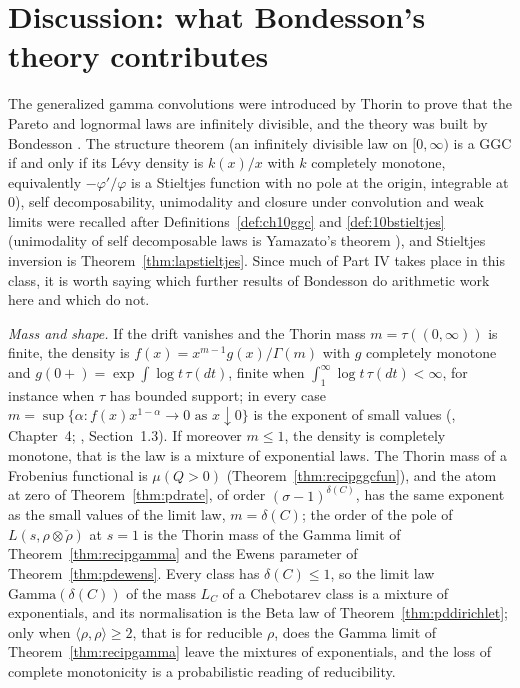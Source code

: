 \section{Discussion: what Bondesson's theory contributes}\label{sec:pdbondesson}

The generalized gamma convolutions were introduced by Thorin \cite{thorin1977,thorin1977b} to prove that the Pareto and lognormal laws are infinitely divisible, and the theory was built by Bondesson \cite{bondesson1992}. The structure theorem (an infinitely divisible law on $[0,\infty)$ is a GGC if and only if its L\'evy density is $k(x)/x$ with $k$ completely monotone, equivalently $-\varphi'/\varphi$ is a Stieltjes function with no pole at the origin, integrable at $0$), self decomposability, unimodality and closure under convolution and weak limits were recalled after Definitions~\ref{def:ch10ggc} and \ref{def:10bstieltjes} (unimodality of self decomposable laws is Yamazato's theorem \cite{yamazato1978}), and Stieltjes inversion is Theorem~\ref{thm:lapstieltjes}. Since much of Part IV takes place in this class, it is worth saying which further results of Bondesson do arithmetic work here and which do not.

\emph{Mass and shape.} If the drift vanishes and the Thorin mass $m=\tau((0,\infty))$ is finite, the density is $f(x)=x^{m-1}g(x)/\Gamma(m)$ with $g$ completely monotone and $g(0+)=\exp\int\log t\,\tau(dt)$, finite when $\int_1^\infty\log t\,\tau(dt)<\infty$, for instance when $\tau$ has bounded support; in every case $m=\sup\{\alpha:f(x)x^{1-\alpha}\to0\text{ as }x\downarrow0\}$ is the exponent of small values (\cite{bondesson1992}, Chapter~4; \cite{jamesroynetteyor2008}, Section~1.3). If moreover $m\le1$, the density is completely monotone, that is the law is a mixture of exponential laws. The Thorin mass of a Frobenius functional is $\mu(Q>0)$ (Theorem~\ref{thm:recipggcfun}), and the atom at zero of Theorem~\ref{thm:pdrate}, of order $(\sigma-1)^{\delta(C)}$, has the same exponent as the small values of the limit law, $m=\delta(C)$; the order of the pole of $L(s,\rho\otimes\check\rho)$ at $s=1$ is the Thorin mass of the Gamma limit of Theorem~\ref{thm:recipgamma} and the Ewens parameter of Theorem~\ref{thm:pdewens}. Every class has $\delta(C)\le1$, so the limit law $\mathrm{Gamma}(\delta(C))$ of the mass $L_C$ of a Chebotarev class is a mixture of exponentials, and its normalisation is the Beta law of Theorem~\ref{thm:pddirichlet}; only when $\langle\rho,\rho\rangle\ge2$, that is for reducible $\rho$, does the Gamma limit of Theorem~\ref{thm:recipgamma} leave the mixtures of exponentials, and the loss of complete monotonicity is a probabilistic reading of reducibility.

